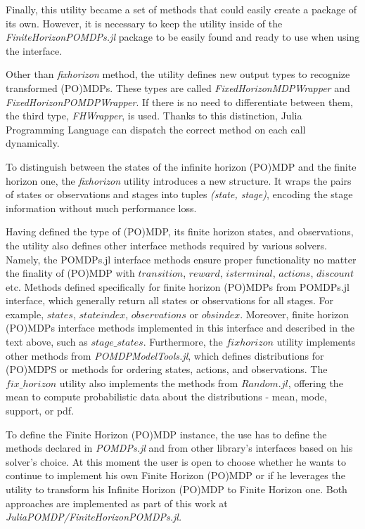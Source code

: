 Finally, this utility became a set of methods that could easily create a package of its own. However, it is necessary to keep the utility inside of the \emph{FiniteHorizonPOMDPs.jl} package to be easily found and ready to use when using the interface. 

Other than \textit{fixhorizon} method, the utility defines new output types to recognize transformed (PO)MDPs. These types are called \textit{FixedHorizonMDPWrapper} and \textit{FixedHorizonPOMDPWrapper}. If there is no need to differentiate between them, the third type, \textit{FHWrapper}, is used. Thanks to this distinction, Julia Programming Language can dispatch the correct method on each call dynamically.

To distinguish between the states of the infinite horizon (PO)MDP and the finite horizon one, the \textit{fixhorizon} utility introduces a new structure. It wraps the pairs of states or observations and stages into tuples \textit{(state, stage)}, encoding the stage information without much performance loss.

Having defined the type of (PO)MDP, its finite horizon states, and observations, the utility also defines other interface methods required by various solvers. Namely, the POMDPs.jl interface methods ensure proper functionality no matter the finality of (PO)MDP with $transition$, $reward$, $isterminal$, $actions$, $discount$ etc. Methods defined specifically for finite horizon (PO)MDPs from POMDPs.jl interface, which generally return all states or observations for all stages. For example, $states$, $stateindex$, $observations$ or $obsindex$. Moreover, finite horizon (PO)MDPs interface methods implemented in this interface and described in the text above, such as $stage\_states$. Furthermore, the $fixhorizon$ utility implements other methods from \textit{POMDPModelTools.jl}, which defines distributions for (PO)MDPS or methods for ordering states, actions, and observations. The $fix\_horizon$ utility also implements the methods from $Random.jl$, offering the mean to compute probabilistic data about the distributions - mean, mode, support, or pdf.


To define the Finite Horizon (PO)MDP instance, the use  has to define the methods declared in \textit{POMDPs.jl} \cite{egorov2017pomdps} and from other library's interfaces based on his solver's choice. At this moment the user is open to choose whether he wants to continue to implement his own Finite Horizon (PO)MDP or if he leverages the utility to transform his Infinite Horizon (PO)MDP to Finite Horizon one. Both approaches are implemented as part of this work at \textit{JuliaPOMDP/FiniteHorizonPOMDPs.jl.} 


